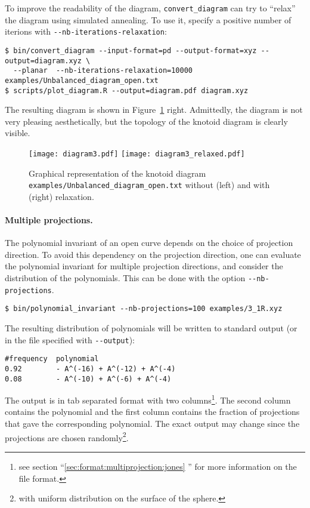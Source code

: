 To improve the readability of the diagram, \lstinline{convert_diagram} can try to ``relax'' the diagram using simulated annealing. To use it, specify a positive number of iterions with \lstinline{--nb-iterations-relaxation}:
\begin{lstlisting}
$ bin/convert_diagram --input-format=pd --output-format=xyz --output=diagram.xyz \
  --planar  --nb-iterations-relaxation=10000 examples/Unbalanced_diagram_open.txt
$ scripts/plot_diagram.R --output=diagram.pdf diagram.xyz
\end{lstlisting}
The resulting diagram is shown in Figure~\ref{fig:diagram3} right. Admittedly, the diagram is not very pleasing aesthetically, but the topology of the knotoid diagram is clearly visible.
\begin{figure}[t]
\centering
\texttt{[image: diagram3.pdf]}
\texttt{[image: diagram3\_relaxed.pdf]}
\caption{Graphical representation of the knotoid diagram \lstinline{examples/Unbalanced_diagram_open.txt} without (left) and with (right) relaxation.}\label{fig:diagram3}
\end{figure}


\paragraph{Multiple projections.}
The polynomial invariant of an open curve depends on the choice of projection direction. To avoid this dependency on the projection direction, one can evaluate the polynomial invariant for multiple projection directions, and consider the distribution of the polynomials. This can be done with the option \lstinline{--nb-projections}. 
\begin{lstlisting}
$ bin/polynomial_invariant --nb-projections=100 examples/3_1R.xyz
\end{lstlisting}
The resulting distribution of polynomials will be written to standard output (or in the file specified with \lstinline{--output}):
\begin{lstlisting}
#frequency  polynomial
0.92	    - A^(-16) + A^(-12) + A^(-4)
0.08	    - A^(-10) + A^(-6) + A^(-4)
\end{lstlisting}
The output is in tab separated format with two columns\footnote{see section ``\ref{sec:format:multiprojection:jones} '' for more information on the file format.}. The second column contains the polynomial and the first column contains the fraction of projections that gave the corresponding polynomial. The exact output may change since the projections are chosen randomly\footnote{with uniform distribution on the surface of the sphere.}.

